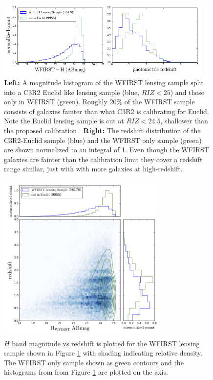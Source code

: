\begin{figure}
\centering
\includegraphics[trim=0cm 0cm 0cm 0cm, clip,width=0.95\textwidth] {Plots/histogram_wfirst_notEuclid.png}
\caption{{\bf Left:} A magnitude histogram of the WFIRST lensing sample split
into a C3R2 Euclid like lensing sample (blue, $RIZ<25$) and those only in WFIRST
(green).  Roughly 20\% of the WFIRST sample consists of galaxies fainter than
what C3R2 is calibrating for Euclid.  Note the Euclid lensing sample is cut at
$RIZ<24.5$, shallower than the proposed calibration \citep{Masters2015}.  {\bf
Right:} The redshift distribution of the C3R2-Euclid sample (blue) and the
WFIRST only sample (green) are shown normalized to an integral of 1. Even though
the WFIRST galaxies are fainter than the calibration limit they cover a redshift
range similar, just with with more galaxies at high-redshift.   }
\label{fig:EuclidVsWFIRST}
\end{figure}

\begin{figure}
\centering
\includegraphics[trim=0cm 0cm 0cm 0cm, clip,width=0.75\textwidth] {Plots/redshift_magnitude.png}
\caption{$H$ band magnitude vs redshift is plotted for the WFIRST lensing sample
shown in Figure \ref{fig:EuclidVsWFIRST} with shading indicating relative
density.  The WFIRST only sample shown as green contours and the histograms from
from Figure \ref{fig:EuclidVsWFIRST} are plotted on the axis.   }
\label{fig:EuclidVsWFIRST2}
\end{figure}

